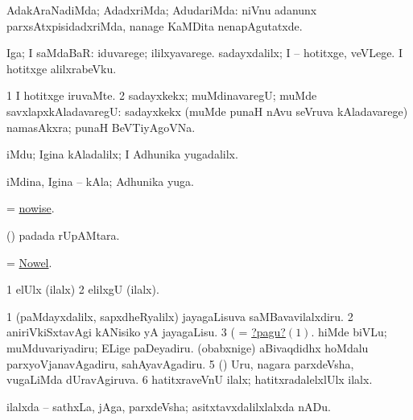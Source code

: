 \bentry
{}
\gl{\saMavayx}
\bmng
AdakAraNadiMda; AdadxriMda; AdudariMda:  niVnu adanunx parxsAtxpisidadxriMda, nanage KaMDita nenapAgutatxde. 
\emng
\eentry

\bentry
{}
\gl{\nA}
\bmng
Iga; I saMdaBaR:  iduvarege; ililxyavarege.  sadayxdalilx; I -- hotitxge, veVLege.  I hotitxge alilxrabeVku. 
\emng

\noindent
\gl{\pagu}
\bmng
\bnum
\num{1}  I hotitxge iruvaMte. 
\num{2}  sadayxkekx; muMdinavaregU; muMde savxlapxkAladavaregU:  sadayxkekx (muMde punaH nAvu seVruva kAladavarege) namasAkxra; punaH BeVTiyAgoVNa. 
\enum
\emng
\eentry

\bentry
{}
\gl{\kirxvi}
\bmng
iMdu; Igina kAladalilx; I Adhunika yugadalilx. 
\emng
\eentry

\bentry
{}
\gl{\nA}
\bmng
iMdina, Igina -- kAla; Adhunika yuga. 
\emng
\eentry

\bentry
{}
\gl{\kirxvi}
\bmng
= \hyperlink{nowise}{nowise}. 
\emng
\eentry

\bentry
{}
\gl{\nA}
\bmng
(\pArxparx)  padada rUpAMtara. 
\emng
\eentry

\bentry
{}
\gl{\nA}
\bmng
= \hyperlink{Nowel}{Nowel}. 
\emng
\eentry

\bentry
{}
\gl{\kirxvi}
\bmng
\bnum
\num{1} elUlx (ilalx) 
\num{2} elilxgU (ilalx). 
\enum
\emng

\noindent
\gl{\pagu}
\bmng
\hypertarget{nowwherepagu1}{} 
\bnum
\num{1} (paMdayxdalilx, sapxdheRyalilx) jayagaLisuva saMBavavilalxdiru. 
\hypertarget{nowwherepagu2}{} 
\num{2}  aniriVkiSxtavAgi kANisiko yA jayagaLisu. 
\num{3}  (  = \hyperlink{nowwherepagu1}{?pagu?\((1)\)}. 
  
\banum
{} hiMde biVLu; muMduvariyadiru; ELige paDeyadiru. 
 (obabxnige) aBivaqdidhx hoMdalu parxyoVjanavAgadiru, sahAyavAgadiru. 
\eanum
\numie
\num{5}  (\AmA) Uru, nagara parxdeVsha, \mo vugaLiMda dUravAgiruva. 
\num{6}  hatitxraveVnU ilalx; hatitxradalelxlUlx ilalx. 
\enum
\emng
\eentry

\bentry
{}
\gl{\sanA}
\bmng
ilalxda -- sathxLa, jAga, parxdeVsha; asitxtavxdalilxlalxda nADu. 
\emng
\eentry

